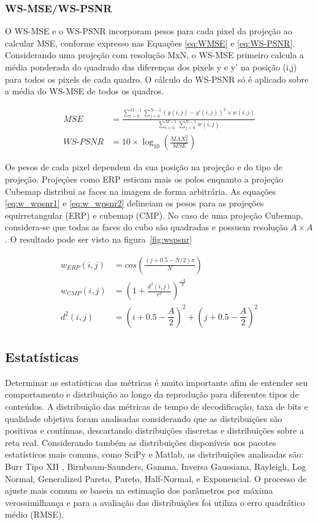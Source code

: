 \subsubsection{WS-MSE/WS-PSNR}

O WS-MSE e o WS-PSNR incorporam pesos para cada pixel da projeção ao calcular MSE, conforme expresso nas Equações \ref{eq:WMSE} e \ref{eq:WS-PSNR}. Considerando uma projeção com resolução MxN, o WS-MSE primeiro calcula a média ponderada do quadrado das diferenças dos pixels y e y' na posição (i,j) para todos os pixels de cada quadro. O cálculo do WS-PSNR só é aplicado sobre a média do WS-MSE de todos os quadros.

\begin{align}
        \label{eq:WMSE}
        MSE&= \frac{\sum^{M-1}_{i=0}\sum^{N-1}_{j=0} \left(y(i,j) - y'(i,j)\right)^2 \times w(i,j)}{\sum^{M-1}_{i=0} \sum^{N-1}_{j=0} w(i,j)}\\[12pt]
        \label{eq:WS-PSNR}
        WS\mbox{-}PSNR&=10 \times \log_{10}\left(\frac{MAX^2_I}{MSE}\right)
\end{align}

Os pesos de cada pixel dependem da sua posição na projeção e do tipo de projeção. Projeções como ERP esticam mais os polos enquanto a projeção Cubemap distribui as faces na imagem de forma arbitrária. As equações \ref{eq:w_wpsnr1} e \ref{eq:w_wpsnr2} delineiam os pesos para as projeções equirretangular (ERP) e cubemap (CMP). No caso de uma projeção Cubemap, considera-se que todas as faces do cubo são quadradas e possuem resolução $A \times A$. O resultado pode ser visto na figura~\ref{fig:wspsnr}

\begin{align}
        \label{eq:w_wpsnr1}
        w_{ERP}(i,j)&=cos\left(\frac{(j+0.5-N/2)\pi}{N}\right) \\
        \label{eq:w_wpsnr2}
        w_{CMP}(i,j)&=\left(1 + \frac{d^2(i,j)}{r^2}\right)^{\frac{-3}{2}} \\
        d^2(i, j)&=(i+0.5-\dfrac{A}{2})^2 +(j+0.5-\dfrac{A}{2})^2
\end{align}

\subsection{Estatísticas}

Determinar as estatísticas das métricas é muito importante afim de entender seu comportamento e distribuição ao longo da reprodução para diferentes tipos de conteúdos. A distribuição das métricas de tempo de decodificação, taxa de bits e qualidade objetiva foram analisadas considerando que as distribuições são positivas e contínuas, descartando distribuições discretas e distribuições sobre a reta real. Considerando também as distribuições disponíveis nos pacotes estatísticos mais comuns, como SciPy e Matlab, as distribuições analisadas são: Burr Tipo XII , Birnbaum-Saunders, Gamma, Inversa Gaussiana, Rayleigh, Log Normal, Generalized Pareto, Pareto, Half-Normal, e Exponencial. O processo de ajuste mais comum se baseia na estimação dos parâmetros por máxima verossimilhança e para a avaliação das distribuições foi utiliza o erro quadrático médio (RMSE).

